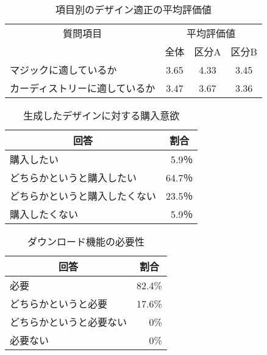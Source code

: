 \begin{table}[htbp]
	\centering
	\caption{項目別のデザイン適正の平均評価値}
	\begin{tabular}{|l|c|c|c|} \hline
    \multicolumn{1}{|c|}{質問項目} & \multicolumn{3}{|c|}{平均評価値} \\ \cline{2-4}
                                &全体 &区分A & 区分B\\ \hline
                                マジックに適しているか & 3.65 & 4.33  & 3.45\\ \hline
                                カーディストリーに適しているか  & 3.47 & 3.67 & 3.36 \\ \hline
	\end{tabular}
	\label{result02}
\end{table}

\begin{table}[htbp]
        \centering
        	\caption{生成したデザインに対する購入意欲}
        \begin{tabular}{|l|r|}
        \hline
        \multicolumn{1}{|c|}{回答} & \multicolumn{1}{c|}{割合} \\ \hline
        購入したい                    & 5.9％                    \\ \hline
        どちらかというと購入したい            & 64.7％                   \\ \hline
        どちらかというと購入したくない          & 23.5％                   \\ \hline
        購入したくない                  & 5.9％                    \\ \hline
        \end{tabular} 
        \label{result03}
\end{table}



\begin{table}[htbp]
    \centering
    \caption{ダウンロード機能の必要性}
    \begin{tabular}{|l|r|} \hline
    \multicolumn{1}{|c|}{回答} & \multicolumn{1}{|c|}{割合}   \\ \hline
    必要 & 82.4\%   \\ \hline
    どちらかというと必要 & 17.6\%  \\ \hline
    どちらかというと必要ない  & 0\%   \\ \hline
    必要ない& 0\%   \\ \hline
    \end{tabular}
    \label{resultlast}
\end{table}

